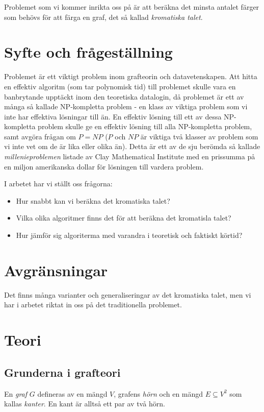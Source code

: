 \documentclass[a4paper]{report}
\begin{document}
Problemet som vi kommer inrikta oss på är att beräkna det minsta antalet färger som behövs för att färga en graf, det så kallad \emph{kromatiska talet}.

\section{Syfte och frågeställning}
Problemet är ett viktigt problem inom grafteorin och datavetenskapen. Att hitta en effektiv algoritm (som tar polynomisk tid) till problemet skulle vara en banbrytande upptäckt inom den teoretiska datalogin, då problemet är ett av många så kallade NP-kompletta problem - en klass av viktiga problem som vi inte har effektiva lösningar till än. En effektiv lösning till
ett av dessa NP-kompletta problem skulle ge en effektiv lösning till alla NP-kompletta problem, samt avgöra frågan om $P = NP$ ($P$ och $NP$ är viktiga två klasser av problem som vi inte vet om de är lika eller olika än). Detta är ett av de sju berömda så kallade \emph{millenieproblemen} listade av Clay Mathematical Institute  med en prissumma på en miljon amerikanska dollar för lösningen till vardera problem.

I arbetet har vi ställt oss frågorna:
\begin{itemize}
\item Hur snabbt kan vi beräkna det kromatiska talet?
\item Vilka olika algoritmer finns det för att beräkna det kromatisla talet?
\item Hur jämför sig algoriterma med varandra i teoretisk och faktiskt körtid?
\end{itemize}

\section{Avgränsningar}
Det finns många varianter och generaliseringar av det kromatiska talet, men vi har i arbetet riktat in oss på det traditionella problemet.

\section{Teori}

\subsection{Grunderna i grafteori}

En \emph{graf} $G$ defineras av en mängd $V$, grafens \emph{hörn} och en mängd $E \subseteq V^2$ som kallas \emph{kanter}. En kant är alltså ett par av två hörn.
\end{document}
